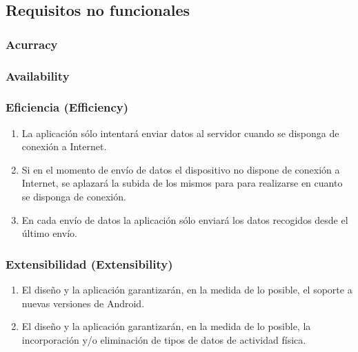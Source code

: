     
    \subsection{Requisitos no funcionales}
        \label{req:especificos:no_funcionales}
        \subsubsection{Acurracy}
        \subsubsection{Availability}
        \subsubsection{Eficiencia (Efficiency)}
            \begin{enumerate}[label=\textbf{\texttt{RNF-\arabic*}}]
                \item La aplicación sólo intentará enviar datos al servidor cuando se disponga de conexión a Internet.
                \item Si en el momento de envío de datos el dispositivo no dispone de conexión a Internet, se aplazará la subida de los mismos para para realizarse en cuanto se disponga de conexión.
                \item En cada envío de datos la aplicación sólo enviará los datos recogidos desde el último envío.
            \end{enumerate}
        \subsubsection{Extensibilidad (Extensibility)}
            \begin{enumerate}[resume, label=\textbf{\texttt{RNF-\arabic*}}]
                \item El diseño y la aplicación garantizarán, en la medida de lo posible, el soporte a nuevas versiones de Android.
                \item El diseño y la aplicación garantizarán, en la medida de lo posible, la incorporación y/o eliminación de tipos de datos de actividad física.
            \end{enumerate}

